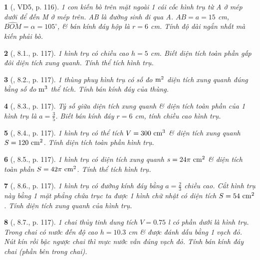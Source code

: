 \documentclass{article}
\newtheorem{baitoan}{}
\begin{document}
\begin{baitoan}[\cite{Binh_boi_duong_Toan_9_tap_2}, VD5, p. 116]
	1 con kiến bò trên mặt ngoài 1 cái cốc hình trụ từ A ở mép dưới để đến M ở mép trên. AB là đường sinh đi qua A. $AB = a = 15$ {\rm cm}, $\widehat{BOM} = \alpha = 105^\circ$, \& bán kính đáy hộp là $r = 6$ {\rm cm}. Tính độ dài ngắn nhất mà kiến phải bò.
\end{baitoan}

\begin{baitoan}[\cite{Binh_boi_duong_Toan_9_tap_2}, 8.1., p. 117]
	1 hình trụ có chiều cao $h = 5$ {\rm cm}. Biết diện tích toàn phần gấp đôi diện tích xung quanh. Tính thể tích hình trụ.
\end{baitoan}

\begin{baitoan}[\cite{Binh_boi_duong_Toan_9_tap_2}, 8.2., p. 117]
	1 thùng phuy hình trụ có số đo $\rm m^2$ diện tích xung quanh đúng bằng số đo $\rm m^3$ thể tích. Tính bán kính đáy của thùng.
\end{baitoan}

\begin{baitoan}[\cite{Binh_boi_duong_Toan_9_tap_2}, 8.3., p. 117]
	Tỷ số giữa diện tích xung quanh \& diện tích toàn phần của 1 hình trụ là $a = \frac{3}{5}$. Biết bán kính đáy $r = 6$ {\rm cm}, tính chiều cao hình trụ.
\end{baitoan}

\begin{baitoan}[\cite{Binh_boi_duong_Toan_9_tap_2}, 8.4., p. 117]
	1 hình trụ có thể tích $V = 300\ {\rm cm}^3$ \& diện tích xung quanh $S = 120\ {\rm cm}^2$. Tính diện tích toàn phần hình trụ.
\end{baitoan}

\begin{baitoan}[\cite{Binh_boi_duong_Toan_9_tap_2}, 8.5., p. 117]
	1 hình trụ có diện tích xung quanh $s = 24\pi\ {\rm cm}^2$ \& diện tích toàn phần $S = 42\pi\ {\rm cm}^2$. Tính thể tích hình trụ.
\end{baitoan}

\begin{baitoan}[\cite{Binh_boi_duong_Toan_9_tap_2}, 8.6., p. 117]
	1 hình trụ có đường kính đáy bằng $a = \frac{2}{3}$ chiều cao. Cắt hình trụ này bằng 1 mặt phẳng chứa trục ta được 1 hình chữ nhật có diện tích $S = 54\ {\rm cm}^2$. Tính diện tích xung quanh của hình trụ.
\end{baitoan}

\begin{baitoan}[\cite{Binh_boi_duong_Toan_9_tap_2}, 8.7., p. 117]
	1 chai thủy tinh dung tích $V = 0.75$ {\rm l} có phần dưới là hình trụ. Trong chai có nước đến độ cao $h = 10.3$ {\rm cm} \& được đánh dấu bằng 1 vạch đỏ. Nút kín rồi bậc ngược chai thì mực nước vẫn đúng vạch đỏ. Tính bán kính đáy chai (phần bên trong chai).
\end{baitoan}
\end{document}

